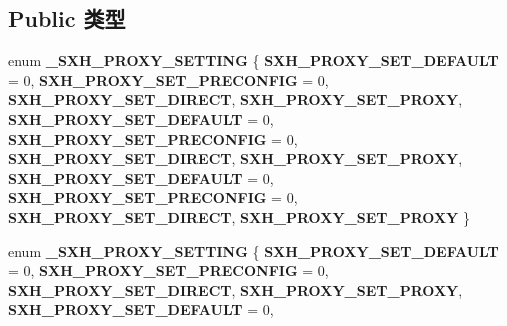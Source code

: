 \subsection*{Public 类型}
\begin{DoxyCompactItemize}
\item 
\mbox{\label{interface_m_s_x_m_l2_1_1_i_server_x_m_l_h_t_t_p_request2_ae6e4737a5b11c735e4879f48c0814be5}} 
enum {\bfseries \+\_\+\+S\+X\+H\+\_\+\+P\+R\+O\+X\+Y\+\_\+\+S\+E\+T\+T\+I\+NG} \{ \newline
{\bfseries S\+X\+H\+\_\+\+P\+R\+O\+X\+Y\+\_\+\+S\+E\+T\+\_\+\+D\+E\+F\+A\+U\+LT} = 0, 
{\bfseries S\+X\+H\+\_\+\+P\+R\+O\+X\+Y\+\_\+\+S\+E\+T\+\_\+\+P\+R\+E\+C\+O\+N\+F\+IG} = 0, 
{\bfseries S\+X\+H\+\_\+\+P\+R\+O\+X\+Y\+\_\+\+S\+E\+T\+\_\+\+D\+I\+R\+E\+CT}, 
{\bfseries S\+X\+H\+\_\+\+P\+R\+O\+X\+Y\+\_\+\+S\+E\+T\+\_\+\+P\+R\+O\+XY}, 
\newline
{\bfseries S\+X\+H\+\_\+\+P\+R\+O\+X\+Y\+\_\+\+S\+E\+T\+\_\+\+D\+E\+F\+A\+U\+LT} = 0, 
{\bfseries S\+X\+H\+\_\+\+P\+R\+O\+X\+Y\+\_\+\+S\+E\+T\+\_\+\+P\+R\+E\+C\+O\+N\+F\+IG} = 0, 
{\bfseries S\+X\+H\+\_\+\+P\+R\+O\+X\+Y\+\_\+\+S\+E\+T\+\_\+\+D\+I\+R\+E\+CT}, 
{\bfseries S\+X\+H\+\_\+\+P\+R\+O\+X\+Y\+\_\+\+S\+E\+T\+\_\+\+P\+R\+O\+XY}, 
\newline
{\bfseries S\+X\+H\+\_\+\+P\+R\+O\+X\+Y\+\_\+\+S\+E\+T\+\_\+\+D\+E\+F\+A\+U\+LT} = 0, 
{\bfseries S\+X\+H\+\_\+\+P\+R\+O\+X\+Y\+\_\+\+S\+E\+T\+\_\+\+P\+R\+E\+C\+O\+N\+F\+IG} = 0, 
{\bfseries S\+X\+H\+\_\+\+P\+R\+O\+X\+Y\+\_\+\+S\+E\+T\+\_\+\+D\+I\+R\+E\+CT}, 
{\bfseries S\+X\+H\+\_\+\+P\+R\+O\+X\+Y\+\_\+\+S\+E\+T\+\_\+\+P\+R\+O\+XY}
 \}
\item 
\mbox{\label{interface_m_s_x_m_l2_1_1_i_server_x_m_l_h_t_t_p_request2_ae6e4737a5b11c735e4879f48c0814be5}} 
enum {\bfseries \+\_\+\+S\+X\+H\+\_\+\+P\+R\+O\+X\+Y\+\_\+\+S\+E\+T\+T\+I\+NG} \{ \newline
{\bfseries S\+X\+H\+\_\+\+P\+R\+O\+X\+Y\+\_\+\+S\+E\+T\+\_\+\+D\+E\+F\+A\+U\+LT} = 0, 
{\bfseries S\+X\+H\+\_\+\+P\+R\+O\+X\+Y\+\_\+\+S\+E\+T\+\_\+\+P\+R\+E\+C\+O\+N\+F\+IG} = 0, 
{\bfseries S\+X\+H\+\_\+\+P\+R\+O\+X\+Y\+\_\+\+S\+E\+T\+\_\+\+D\+I\+R\+E\+CT}, 
{\bfseries S\+X\+H\+\_\+\+P\+R\+O\+X\+Y\+\_\+\+S\+E\+T\+\_\+\+P\+R\+O\+XY}, 
\newline
{\bfseries S\+X\+H\+\_\+\+P\+R\+O\+X\+Y\+\_\+\+S\+E\+T\+\_\+\+D\+E\+F\+A\+U\+LT} = 0, 

\end{DoxyCompactItemize}
